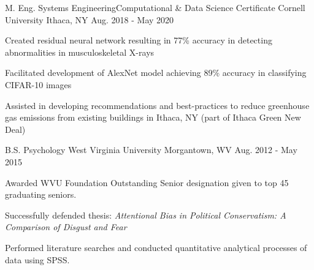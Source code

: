 


\begin{cventries}


\cventry
{M. Eng. Systems Engineering{\enskip\cdotp\enskip}Computational \& Data Science Certificate} %
{Cornell University} %
{Ithaca, NY} %
{Aug. 2018 -  May 2020} %
{ %
\begin{cvitems}
\item {Created residual neural network  resulting in 77\% accuracy in detecting abnormalities in musculoskeletal X-rays}
\item {Facilitated development of AlexNet model achieving 89\% accuracy in classifying CIFAR-10 images} 
\item {Assisted in developing recommendations and best-practices to reduce greenhouse gas emissions from existing buildings in Ithaca, NY (part of Ithaca Green New Deal)}
\end{cvitems}
}

\cventry
{B.S. Psychology} %
{West Virginia University} %
{Morgantown, WV} %
{Aug. 2012 -  May 2015} %
{ %
	\begin{cvitems}
		\item {Awarded WVU Foundation Outstanding Senior designation given to top 45 graduating seniors.}
		\item {Successfully defended thesis: \textit{Attentional Bias in Political Conservatism: A Comparison of Disgust and Fear}}
		\item {Performed literature searches and conducted quantitative analytical processes of data using SPSS.}
	\end{cvitems}
}


\end{cventries}
